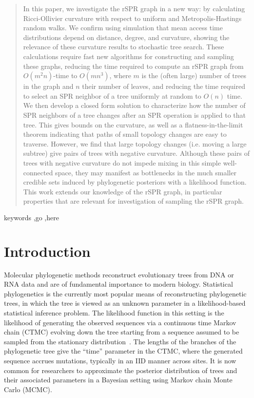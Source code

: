 \documentclass[]{elsarticle}
\begin{document}
\begin{frontmatter}
\begin{abstract}
In this paper, we investigate the rSPR graph in a new way: by calculating Ricci-Ollivier curvature with respect to uniform and Metropolis-Hastings random walks.
We confirm using simulation that mean access time distributions depend on distance, degree, and curvature, showing the relevance of these curvature results to stochastic tree search.
These calculations require fast new algorithms for constructing and sampling these graphs, reducing the time required to compute an rSPR graph from $O(m^2n)$-time to $O(mn^3)$, where $m$ is the (often large) number of trees in the graph and $n$ their number of leaves, and reducing the time required to select an SPR neighbor of a tree uniformly at random to $O(n)$ time.
We then develop a closed form solution to characterize how the number of SPR neighbors of a tree changes after an SPR operation is applied to that tree.
This gives bounds on the curvature, as well as a flatness-in-the-limit theorem indicating that paths of small topology changes are easy to traverse.
However, we find that large topology changes (i.e. moving a large subtree) give pairs of trees with negative curvature.
Although these pairs of trees with negative curvature do not impede mixing in this simple well-connected space, they may manifest as bottlenecks in the much smaller credible sets induced by phylogenetic posteriors with a likelihood function.
This work extends our knowledge of the rSPR graph, in particular properties that are relevant for investigation of sampling the rSPR graph.
\end{abstract}

\begin{keyword}
keywords \sep go \sep here
\end{keyword}

\end{frontmatter}



\section{Introduction}
Molecular phylogenetic methods reconstruct evolutionary trees from DNA or RNA data and are of fundamental importance to modern biology.
Statistical phylogenetics is the currently most popular means of reconstructing phylogenetic trees, in which the tree is viewed as an unknown parameter in a likelihood-based statistical inference problem.
The likelihood function in this setting is the likelihood of generating the observed sequences via a continuous time Markov chain (CTMC) evolving down the tree starting from a sequence assumed to be sampled from the stationary distribution~\citep{felsenstein1981evolutionary}.
The lengths of the branches of the phylogenetic tree give the ``time'' parameter in the CTMC, where the generated sequence accrues mutations, typically in an IID manner across sites.
It is now common for researchers to approximate the posterior distribution of trees and their associated parameters in a Bayesian setting using Markov chain Monte Carlo (MCMC).
\end{document}
